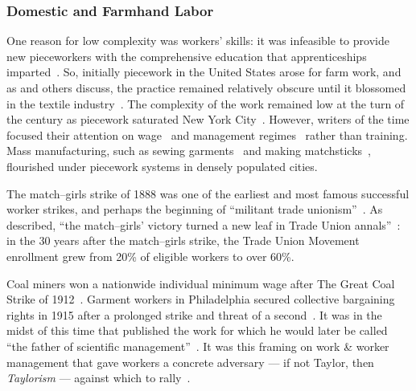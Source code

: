 \documentclass[trackingWork]{subfiles}
\begin{document}
\onlyinsubfile{\clearpage}
\subsubsection{Domestic and Farmhand Labor}
One reason for low complexity was workers' skills:
it was infeasible to provide new pieceworkers with the comprehensive education
that apprenticeships imparted~\cite{hart2013rise}.
So, initially piecework in the United States arose for farm work, and as
\citeauthor{hughRaynbirdTaskWork} and others discuss,
the practice remained relatively obscure until
it blossomed in the textile industry~\cite{hughRaynbirdTaskWork}.
The complexity of the work remained low at the turn of
the  century as piecework saturated New York City~\cite{riisOtherSideLives}.
However, writers of the time focused their attention on
wage~\cite{burton1899commercial} and
management regimes~\cite{norton1900textile}
rather than training.
Mass manufacturing,
such as sewing garments~\cite{riisOtherSideLives} and making matchsticks~\cite{10.2307/3827491},
flourished under piecework systems in densely populated cities.

The match--girls strike of 1888 was one of the earliest and most famous successful worker strikes,
and perhaps the beginning of ``militant trade unionism''~\cite{10.2307/3827491}.
As \citeauthor{weyer1894history} described,
``the match--girls' victory turned a new leaf in Trade Union annals''~\cite{weyer1894history}: in the 30 years after the match--girls strike,
the Trade Union Movement enrollment grew from 20\% of eligible workers to over 60\%.

Coal miners won a nationwide individual minimum wage after The Great Coal Strike of 1912~\cite{10.2307/2221944}.
Garment workers in Philadelphia secured collective bargaining rights in 1915 after a prolonged strike and threat of a second~\cite{10.2307/41829256}.
It was in the midst of this time that \citeauthor{taylor1914principles} published
the work for which he would later be called ``the father of scientific management''~\cite{RePEc:mtp:titles:0262612062}.
It was this framing on work \& worker management that gave workers a concrete adversary
--- if not Taylor, then \textit{Taylorism}  ---
against which to rally~\cite{jacoby1983union,parker1920casual}.
\end{document}
